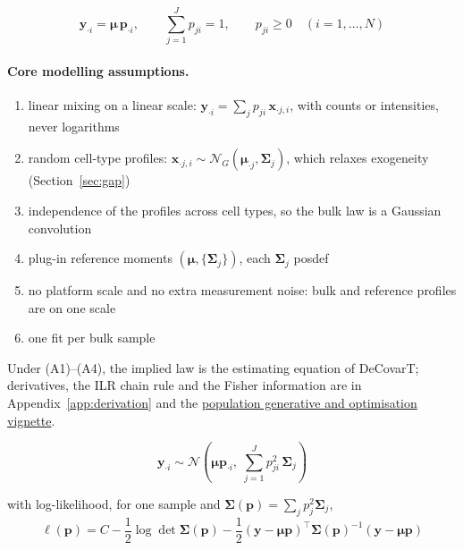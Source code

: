 \documentclass[pdflatex, sn-nature]{sn-jnl}
\theoremstyle{thmstyleone}%
\theoremstyle{thmstyletwo}%
\theoremstyle{thmstylethree}%
\newcommand{\vignette}[2]{\href{https://bastienchassagnol.github.io/DeCovarT/articles/#1}{#2}}
\begin{document}
\begin{equation}
  \boldsymbol{y}_{\cdot i}=\boldsymbol{\mu}\,\boldsymbol{p}_{\cdot i},
  \qquad
  \sum_{j=1}^{J}p_{ji}=1,
  \qquad
  p_{ji}\ge 0
  \quad(i=1,\ldots,N)
  \label{eq-linear-deconvolution}
\end{equation}

\paragraph{Core modelling assumptions.}
\begin{enumerate}[label=(A\arabic*)]
  \item linear mixing on a linear scale: \(\boldsymbol{y}_{\cdot i}=\sum_{j}p_{ji}\,\boldsymbol{x}_{\cdot j,i}\), with
        counts or intensities, never logarithms
  \item random cell-type profiles: \(\boldsymbol{x}_{\cdot j,i}\sim\mathcal{N}_{G}(\boldsymbol{\mu}_{\cdot j},\boldsymbol{\Sigma}_{j})\), which
        relaxes exogeneity (Section~\ref{sec:gap})
  \item independence of the profiles across cell types, so the bulk law is a Gaussian \gls{convolution}
  \item plug-in reference moments \((\boldsymbol{\mu},\{\boldsymbol{\Sigma}_{j}\})\), each \(\boldsymbol{\Sigma}_{j}\) \gls{posdef}
  \item no platform scale and no extra measurement noise: bulk and reference profiles are on one scale
  \item one fit per bulk sample
\end{enumerate}
Under (A1)--(A4), the implied law is the estimating equation of DeCovarT; derivatives, the ILR
chain rule and the Fisher information are in Appendix~\ref{app:derivation} and the
\vignette{01-1-population-generative-optimisation.html}{population generative and optimisation vignette}.

\begin{equation}
  \boldsymbol{y}_{\cdot i}
  \sim
  \mathcal{N}\!\left(
    \boldsymbol{\mu}\boldsymbol{p}_{\cdot i},\;
    \sum_{j=1}^{J} p_{ji}^{2}\,\boldsymbol{\Sigma}_{j}
  \right)
  \label{eq:convolution}
\end{equation}

with log-likelihood, for one sample and \(\boldsymbol{\Sigma}(\boldsymbol{p})=\sum_{j}p_{j}^{2}\boldsymbol{\Sigma}_{j}\),
\begin{equation}
  \ell(\boldsymbol{p})
  =C-\frac{1}{2}\log\det\boldsymbol{\Sigma}(\boldsymbol{p})
  -\frac{1}{2}(\boldsymbol{y}-\boldsymbol{\mu}\boldsymbol{p})^{\top}\boldsymbol{\Sigma}(\boldsymbol{p})^{-1}(\boldsymbol{y}-\boldsymbol{\mu}\boldsymbol{p})
  \label{eq-loglikelihood-multivariate-gaussian}
\end{equation}
\end{document}
